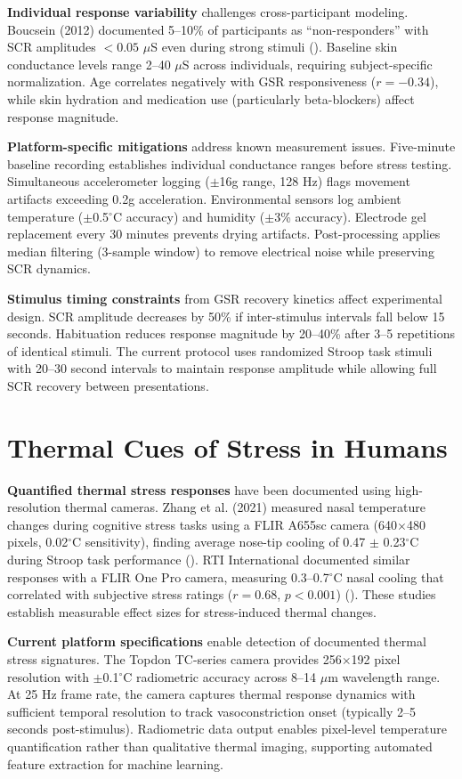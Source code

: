 \textbf{Individual response variability} challenges cross-participant modeling. Boucsein (2012) documented 5--10\% of participants as ``non-responders'' with SCR amplitudes $<0.05$ $\mu$S even during strong stimuli (\citep{ref1}). Baseline skin conductance levels range 2--40 $\mu$S across individuals, requiring subject-specific normalization. Age correlates negatively with GSR responsiveness ($r = -0.34$), while skin hydration and medication use (particularly beta-blockers) affect response magnitude.

\textbf{Platform-specific mitigations} address known measurement issues. Five-minute baseline recording establishes individual conductance ranges before stress testing. Simultaneous accelerometer logging ($\pm$16g range, 128 Hz) flags movement artifacts exceeding 0.2g acceleration. Environmental sensors log ambient temperature ($\pm$0.5$^\circ$C accuracy) and humidity ($\pm$3\% accuracy). Electrode gel replacement every 30 minutes prevents drying artifacts. Post-processing applies median filtering (3-sample window) to remove electrical noise while preserving SCR dynamics.

\textbf{Stimulus timing constraints} from GSR recovery kinetics affect experimental design. SCR amplitude decreases by 50\% if inter-stimulus intervals fall below 15 seconds. Habituation reduces response magnitude by 20--40\% after 3--5 repetitions of identical stimuli. The current protocol uses randomized Stroop task stimuli with 20--30 second intervals to maintain response amplitude while allowing full SCR recovery between presentations.


\section{Thermal Cues of Stress in Humans}
\textbf{Quantified thermal stress responses} have been documented using high-resolution thermal cameras. Zhang et al. (2021) measured nasal temperature changes during cognitive stress tasks using a FLIR A655sc camera (640$\times$480 pixels, 0.02$^\circ$C sensitivity), finding average nose-tip cooling of 0.47 $\pm$ 0.23$^\circ$C during Stroop task performance (\citep{ref5}). RTI International documented similar responses with a FLIR One Pro camera, measuring 0.3--0.7$^\circ$C nasal cooling that correlated with subjective stress ratings ($r = 0.68$, $p < 0.001$) (\citep{ref6}). These studies establish measurable effect sizes for stress-induced thermal changes.

\textbf{Current platform specifications} enable detection of documented thermal stress signatures. The Topdon TC-series camera provides 256$\times$192 pixel resolution with $\pm$0.1$^\circ$C radiometric accuracy across 8--14 $\mu$m wavelength range. At 25 Hz frame rate, the camera captures thermal response dynamics with sufficient temporal resolution to track vasoconstriction onset (typically 2--5 seconds post-stimulus). Radiometric data output enables pixel-level temperature quantification rather than qualitative thermal imaging, supporting automated feature extraction for machine learning.

